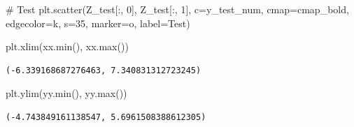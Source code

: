 \documentclass[
  letterpaper,
  DIV=11,
  numbers=noendperiod]{scrartcl}
\newenvironment{Shaded}{\begin{snugshade}}{\end{snugshade}}
\newcommand{\BuiltInTok}[1]{\textcolor[rgb]{0.00,0.23,0.31}{#1}}
\newcommand{\CommentTok}[1]{\textcolor[rgb]{0.37,0.37,0.37}{#1}}
\newcommand{\DecValTok}[1]{\textcolor[rgb]{0.68,0.00,0.00}{#1}}
\newcommand{\NormalTok}[1]{\textcolor[rgb]{0.00,0.23,0.31}{#1}}
\newcommand{\OperatorTok}[1]{\textcolor[rgb]{0.37,0.37,0.37}{#1}}
\newcommand{\StringTok}[1]{\textcolor[rgb]{0.13,0.47,0.30}{#1}}
\begin{document}
\begin{Shaded}
\begin{Highlighting}[]
\CommentTok{\# Test}
\NormalTok{plt.scatter(Z\_test[:, }\DecValTok{0}\NormalTok{],  Z\_test[:, }\DecValTok{1}\NormalTok{],  c}\OperatorTok{=}\NormalTok{y\_test\_num,  cmap}\OperatorTok{=}\NormalTok{cmap\_bold,}
\NormalTok{            edgecolor}\OperatorTok{=}\StringTok{\textquotesingle{}k\textquotesingle{}}\NormalTok{, s}\OperatorTok{=}\DecValTok{35}\NormalTok{, marker}\OperatorTok{=}\StringTok{\textquotesingle{}o\textquotesingle{}}\NormalTok{, label}\OperatorTok{=}\StringTok{\textquotesingle{}Test\textquotesingle{}}\NormalTok{)}

\NormalTok{plt.xlim(xx.}\BuiltInTok{min}\NormalTok{(), xx.}\BuiltInTok{max}\NormalTok{())}
\end{Highlighting}
\end{Shaded}

\begin{verbatim}
(-6.339168687276463, 7.340831312723245)
\end{verbatim}

\begin{Shaded}
\begin{Highlighting}[]
\NormalTok{plt.ylim(yy.}\BuiltInTok{min}\NormalTok{(), yy.}\BuiltInTok{max}\NormalTok{())}
\end{Highlighting}
\end{Shaded}

\begin{verbatim}
(-4.743849161138547, 5.6961508388612305)
\end{verbatim}
\end{document}
